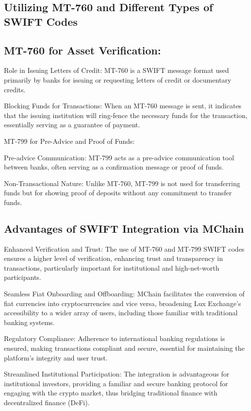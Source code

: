 \documentclass[11pt]{article}
\begin{document}
\subsection{Utilizing MT-760 and Different Types of SWIFT Codes}

\subsection{MT-760 for Asset Verification:}

Role in Issuing Letters of Credit: MT-760 is a SWIFT message format used primarily by banks for issuing or requesting letters of credit or documentary credits​​​​.


Blocking Funds for Transactions: When an MT-760 message is sent, it indicates that the issuing institution will ring-fence the necessary funds for the transaction, essentially serving as a guarantee of payment​​.


MT-799 for Pre-Advice and Proof of Funds:


Pre-advice Communication: MT-799 acts as a pre-advice communication tool between banks, often serving as a confirmation message or proof of funds​​.


Non-Transactional Nature: Unlike MT-760, MT-799 is not used for transferring funds but for showing proof of deposits without any commitment to transfer funds​​.


\subsection{Advantages of SWIFT Integration via MChain}

Enhanced Verification and Trust: The use of MT-760 and MT-799 SWIFT codes ensures a higher level of verification, enhancing trust and transparency in transactions, particularly important for institutional and high-net-worth participants.


Seamless Fiat Onboarding and Offboarding: MChain facilitates the conversion of fiat currencies into cryptocurrencies and vice versa, broadening Lux Exchange's accessibility to a wider array of users, including those familiar with traditional banking systems.


Regulatory Compliance: Adherence to international banking regulations is ensured, making transactions compliant and secure, essential for maintaining the platform's integrity and user trust.


Streamlined Institutional Participation: The integration is advantageous for institutional investors, providing a familiar and secure banking protocol for engaging with the crypto market, thus bridging traditional finance with decentralized finance (DeFi).
\end{document}
